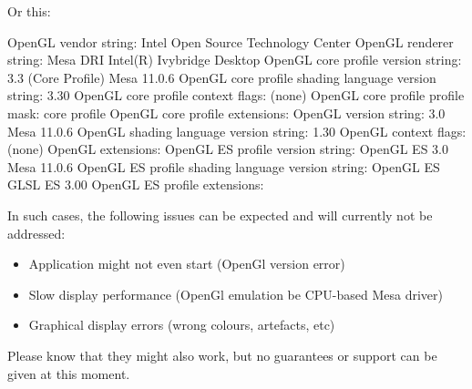Or this:

\begin{cverbatim}
OpenGL vendor string: Intel Open Source Technology Center
OpenGL renderer string: Mesa DRI Intel(R) Ivybridge Desktop 
OpenGL core profile version string: 3.3 (Core Profile) Mesa 11.0.6
OpenGL core profile shading language version string: 3.30
OpenGL core profile context flags: (none)
OpenGL core profile profile mask: core profile
OpenGL core profile extensions:
OpenGL version string: 3.0 Mesa 11.0.6
OpenGL shading language version string: 1.30
OpenGL context flags: (none)
OpenGL extensions:
OpenGL ES profile version string: OpenGL ES 3.0 Mesa 11.0.6
OpenGL ES profile shading language version string: OpenGL ES GLSL ES 3.00
OpenGL ES profile extensions:
\end{cverbatim}

In such cases, the following issues can be expected and will currently not be addressed:

\begin{itemize} 
\item Application might not even start (OpenGl version error)
\item Slow display performance (OpenGl emulation be CPU-based Mesa driver)
\item Graphical display errors (wrong colours, artefacts, etc) 
\end{itemize} 

Please know that they might also work, but no guarantees or support can be given at this moment. 
